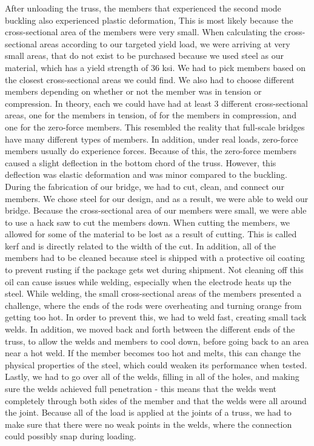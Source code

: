 \documentclass{article}
\begin{document}
    \indent After unloading the truss, the members that experienced the second mode buckling also experienced plastic deformation, This is most likely because the cross-sectional area of the members were very small. When calculating the cross-sectional areas according to our targeted yield load, we were arriving at very small areas, that do not exist to be purchased because we used steel as our material, which has a yield strength of 36 ksi. We had to pick members based on the closest cross-sectional areas we could find. We also had to choose different members depending on whether or not the member was in tension or compression. In theory, each we could have had at least 3 different cross-sectional areas, one for the members in tension, of for the members in compression, and one for the zero-force members. This resembled the reality that full-scale bridges have many different types of members. In addition, under real loads, zero-force members usually do experience forces. Because of this, the zero-force members caused a slight deflection in the bottom chord of the truss. However, this deflection was elastic deformation and was minor compared to the buckling.  \\
    \indent During the fabrication of our bridge, we had to cut, clean, and connect our members. We chose steel for our design, and as a result, we were able to weld our bridge. Because the cross-sectional area of our members were small, we were able to use a hack saw to cut the members down. When cutting the members, we allowed for some of the material to be lost as a result of cutting. This is called kerf and is directly related to the width of the cut. In addition, all of the members had to be cleaned because steel is shipped with a protective oil coating to prevent rusting if the package gets wet during shipment. Not cleaning off this oil can cause issues while welding, especially when the electrode heats up the steel. While welding, the small cross-sectional areas of the members presented a challenge, where the ends of the rods were overheating and turning orange from getting too hot. In order to prevent this, we had to weld fast, creating small tack welds. In addition, we moved back and forth between the different ends of the truss, to allow the welds and members to cool down, before going back to an area near a hot weld. If the member becomes too hot and melts, this can change the physical properties of the steel, which could weaken its performance when tested. Lastly, we had to go over all of the welds, filling in all of the holes, and making sure the welds achieved full penetration - this means that the welds went completely through both sides of the member and that the welds were all around the joint. Because all of the load is applied at the joints of a truss, we had to make sure that there were no weak points in the welds, where the connection could possibly snap during loading. 
\end{document}
